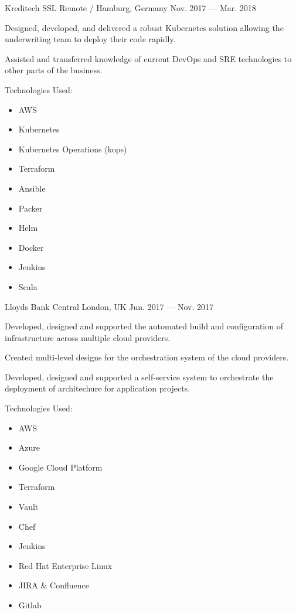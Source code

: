 \begin{cventries}
	{Kreditech SSL}
	{Remote / Hamburg, Germany}
	{Nov. 2017 — Mar. 2018}
	{
		\begin{cvitems}
			\item{Designed, developed, and delivered a robust Kubernetes solution allowing the underwriting team to deploy their code rapidly.}
			\item{Assisted and transferred knowledge of current DevOps and SRE technologies to other parts of the business.}
			\item{Technologies Used:}
				\begin{itemize}
					\item AWS
					\item Kubernetes
					\item Kubernetes Operations (kops)
					\item Terraform
					\item Ansible
					\item Packer
					\item Helm
					\item Docker
					\item Jenkins
					\item Scala
				\end{itemize}
		\end{cvitems}
	}

	{Lloyds Bank}
	{Central London, UK}
	{Jun. 2017 — Nov. 2017}
	{
		\begin{cvitems}
		\item {Developed, designed and supported the automated build and configuration of infrastructure across multiple cloud providers.}
		\item {Created multi-level designs for the orchestration system of the cloud providers.}
		\item {Developed, designed and supported a self-service system to orchestrate the deployment of architechure for application projects.}
		\item {Technologies Used: }
			\begin{itemize}
				\item {AWS}
				\item {Azure}
				\item {Google Cloud Platform}
				\item {Terraform}
				\item {Vault}
				\item {Chef}
				\item {Jenkins}
				\item {Red Hat Enterprise Linux}
				\item {JIRA \& Confluence}
				\item {Gitlab}
			\end{itemize}
		\end{cvitems}
	}


\end{cventries}
